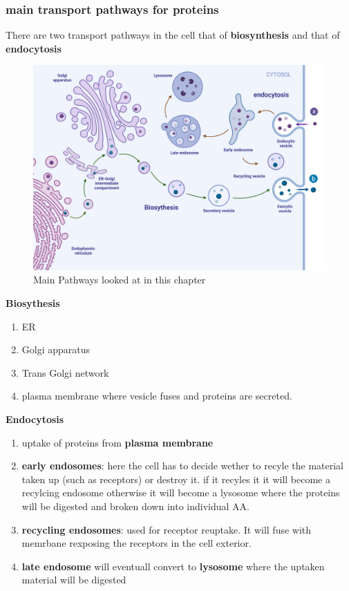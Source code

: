 \documentclass[../main.tex]{subfiles}
\begin{document}
\subsubsection{main transport pathways for proteins}
There are two transport pathways in the cell that of \textbf{biosynthesis} and that of \textbf{endocytosis}
\begin{figure}[H]
    \centering
    \includegraphics[width=0.7\linewidth]{Pathways (1).png}
    \caption{Main Pathways looked at in this chapter}
    \label{fig:enter-label}
\end{figure}
\textbf{Biosythesis}
\begin{enumerate}
    \item ER
    \item Golgi apparatus
    \item Trans Golgi network
    \item plasma membrane where vesicle fuses and proteins are secreted.
\end{enumerate}

\textbf{Endocytosis}
\begin{enumerate}
    \item uptake of proteins from \textbf{plasma membrane}
    \item \textbf{early endosomes}: here the cell has to decide wether to recyle the material taken up (such as receptors) or destroy it. if it recyles it it will become a recylcing endosome otherwise it will become a lysosome where the proteins will be digested and broken down into individual AA.
    \item  \textbf{recycling endosomes}: used for receptor reuptake. It will fuse with memrbane rexposing the receptors in the cell exterior.

    \item \textbf{late endosome} will eventuall convert to \textbf{lysosome } where the uptaken material will be digested
\end{enumerate}
\end{document}
